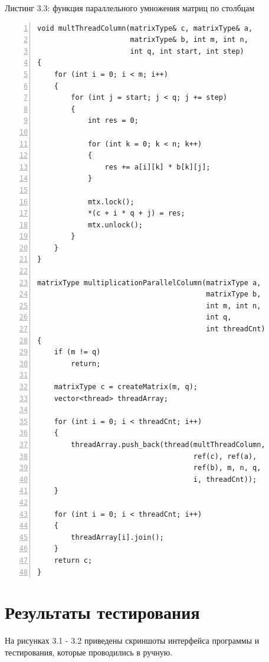 \documentclass[12pt,a4paper]{report}
\begin{document}
\textrm{Листинг 3.3: функция параллельного умножения матриц по столбцам}
\begin{lstlisting}[frame=single, numbers=left]
void multThreadColumn(matrixType& c, matrixType& a, 
                      matrixType& b, int m, int n, 
                      int q, int start, int step)
{
    for (int i = 0; i < m; i++)
    {
        for (int j = start; j < q; j += step)
        {
            int res = 0;
    
            for (int k = 0; k < n; k++)
            {
                res += a[i][k] * b[k][j];
            }
    
            mtx.lock();
            *(c + i * q + j) = res;
            mtx.unlock();
        }
    }
}
    
matrixType multiplicationParallelColumn(matrixType a, 
                                        matrixType b, 
                                        int m, int n, 
                                        int q, 
                                        int threadCnt)
{
    if (m != q)
        return;

    matrixType c = createMatrix(m, q);
    vector<thread> threadArray;
    
    for (int i = 0; i < threadCnt; i++)
    {
        threadArray.push_back(thread(multThreadColumn, 
                                     ref(c), ref(a), 
                                     ref(b), m, n, q, 
                                     i, threadCnt));
    }
    
    for (int i = 0; i < threadCnt; i++)
    {
        threadArray[i].join();
    }
    return c;
}
\end{lstlisting}

\section{Результаты тестирования}

На рисунках 3.1 - 3.2 приведены скриншоты интерфейса программы и тестирования, которые проводились в ручную.
\end{document}
